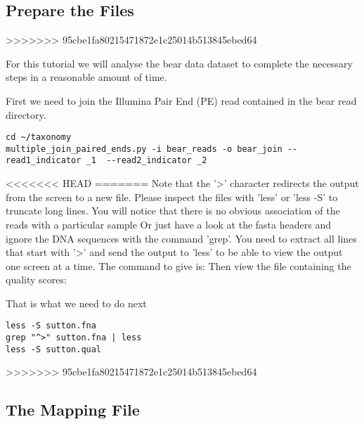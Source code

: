 \subsection{Prepare the Files}
>>>>>>> 95cbe1fa80215471872e1c25014b513845ebed64

\begin{information}
For this tutorial we will analyse the bear data dataset to complete the necessary steps in a reasonable amount of time.
\end{information}

\begin{steps}
First we need to join the Illumina Pair End (PE) read contained in the bear read  directory.

\begin{lstlisting}
cd ~/taxonomy
multiple_join_paired_ends.py -i bear_reads -o bear_join --read1_indicator _1  --read2_indicator _2
\end{lstlisting}

<<<<<<< HEAD
=======
Note that the '>' character redirects the output from the screen to a new file. Please inspect the files with 'less' or 'less -S' to truncate long lines. You will notice that there is no obvious association of the reads with a particular sample
Or just have a look at the fasta headers and ignore the DNA sequences with the command 'grep'. You need to extract all lines that start with '>' and send the output to 'less' to be able to view the output one screen at a time. The command to give is:
Then view the file containing the quality scores:

That is what we need to do next

\begin{lstlisting}
less -S sutton.fna
grep "^>" sutton.fna | less
less -S sutton.qual

\end{lstlisting}
>>>>>>> 95cbe1fa80215471872e1c25014b513845ebed64
\end{steps}

\subsection{The Mapping File}

